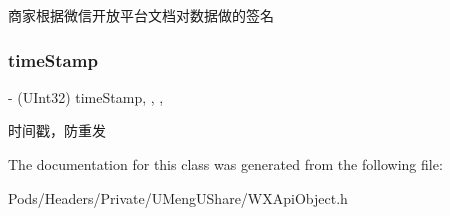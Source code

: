 商家根据微信开放平台文档对数据做的签名 \mbox{\label{interface_pay_req_a86b06f5d10b430b4ca3f7628d12f137c}} 
\subsubsection{\texorpdfstring{time\+Stamp}{timeStamp}}
{\footnotesize\ttfamily -\/ (U\+Int32) time\+Stamp\hspace{0.3cm}{\ttfamily [read]}, {\ttfamily [write]}, {\ttfamily [nonatomic]}, {\ttfamily [assign]}}

时间戳，防重发 

The documentation for this class was generated from the following file\+:\begin{DoxyCompactItemize}
\item 
Pods/\+Headers/\+Private/\+U\+Meng\+U\+Share/W\+X\+Api\+Object.\+h\end{DoxyCompactItemize}
